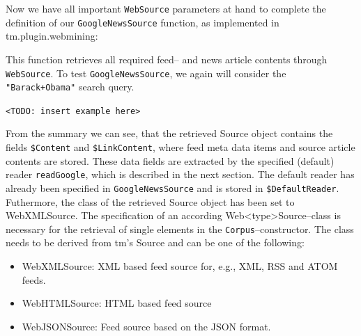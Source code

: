 \documentclass[a4paper]{article}
\let\code=\texttt
\newcommand{\class}[1]{\mbox{\textsf{#1}}}
\newcommand{\pkg}[1]{{\normalfont\fontseries{b}\selectfont #1}}
\newcommand{\proglang}[1]{\textsf{#1}}
\newcommand{\fkt}[1]{\code{#1}}
\newcommand{\todo}[1]{\begin{center}\code{<TODO: #1>}\end{center}}
\newcommand{\field}[1]{\code{\$#1}}
\begin{document}
Now we have all important \fkt{WebSource} parameters at hand to complete the definition of our
\fkt{GoogleNewsSource} function, as implemented in \pkg{tm.plugin.webmining}:
\begin{Schunk}
\end{Schunk}
This function retrieves all required feed-- and news article contents through \fkt{WebSource}.
To test \fkt{GoogleNewsSource}, we again will consider the \code{"Barack+Obama"} search query.
\todo{insert example here}
From the summary we can see, that the retrieved \class{Source} object contains the fields
\field{Content} and \field{LinkContent}, where feed meta data items and source article contents are
stored. These data fields are extracted by the specified (default) reader \fkt{readGoogle}, which
is described in the next section. The default reader has already been specified in \fkt{GoogleNewsSource} 
and is stored in \field{DefaultReader}. Futhermore, the class of the retrieved \class{Source} object 
has been set to \class{WebXMLSource}. The specification of an according \class{Web<type>Source}--class
is necessary for the retrieval of single elements in the \fkt{Corpus}--constructor. The class needs
to be derived from \pkg{tm}'s \class{Source} and can be one of the following:
\begin{itemize}
\item \class{WebXMLSource}: \proglang{XML} based feed source for, e.g., \proglang{XML}, \proglang{RSS} 
and \proglang{ATOM} feeds.
\item \class{WebHTMLSource}: \proglang{HTML} based feed source
\item \class{WebJSONSource}: Feed source based on the \proglang{JSON} format.
\end{itemize}
\end{document}
